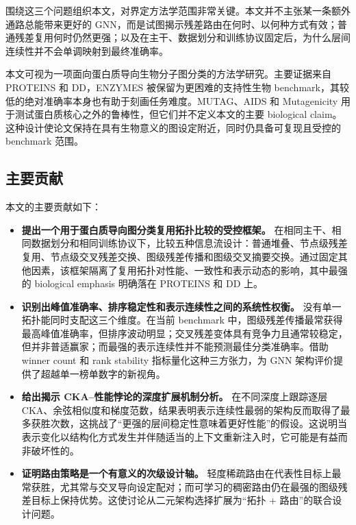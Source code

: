 围绕这三个问题组织本文，对界定方法学范围非常关键。本文并不主张某一条额外通路总能带来更好的 GNN，而是试图揭示残差路由在何时、以何种方式有效；普通残差复用何时仍然更强；以及在主干、数据划分和训练协议固定后，为什么层间连续性并不会单调映射到最终准确率。

本文可视为一项面向蛋白质导向生物分子图分类的方法学研究。主要证据来自 PROTEINS 和 DD，ENZYMES 被保留为更困难的支持性生物 benchmark，其较低的绝对准确率本身也有助于刻画任务难度。MUTAG、AIDS 和 Mutagenicity 用于测试蛋白质核心之外的鲁棒性，但它们并不定义本文的主要 biological claim。这种设计使论文保持在具有生物意义的图设定附近，同时仍具备可复现且受控的 benchmark 范围。

\subsection{主要贡献}

本文的主要贡献如下：

\begin{itemize}
    \item \textbf{提出一个用于蛋白质导向图分类复用拓扑比较的受控框架。} 在相同主干、相同数据划分和相同训练协议下，比较五种信息流设计：普通堆叠、节点级残差复用、节点级交叉残差交换、图级残差传播和图级交叉摘要交换。通过固定其他因素，该框架隔离了复用拓扑对性能、一致性和表示动态的影响，其中最强的 biological emphasis 明确落在 PROTEINS 和 DD 上。

    \item \textbf{识别出峰值准确率、排序稳定性和表示连续性之间的系统性权衡。} 没有单一拓扑能同时支配这三个维度。在当前 benchmark 中，图级残差传播最常获得最高峰值准确率，但排序波动明显；交叉残差变体具有竞争力且通常较稳定，但并非普适赢家；而最强的表示连续性并不能预测最佳分类准确率。借助 winner count 和 rank stability 指标量化这种三方张力，为 GNN 架构评价提供了超越单一榜单数字的新视角。

    \item \textbf{给出揭示 CKA--性能悖论的深度扩展机制分析。} 在不同深度上跟踪逐层 CKA、余弦相似度和梯度范数，结果表明表示连续性最弱的架构反而取得了最多获胜次数，这挑战了“更强的层间稳定性意味着更好性能”的假设。这说明当表示变化以结构化方式发生并伴随适当的上下文重新注入时，它可能是有益而非破坏性的。

    \item \textbf{证明路由策略是一个有意义的次级设计轴。} 轻度稀疏路由在代表性目标上最常获胜，尤其常与交叉导向设定配对；而可学习的稠密路由仍在最强的图级残差目标上保持优势。这使讨论从二元架构选择扩展为“拓扑 + 路由”的联合设计问题。
\end{itemize}
